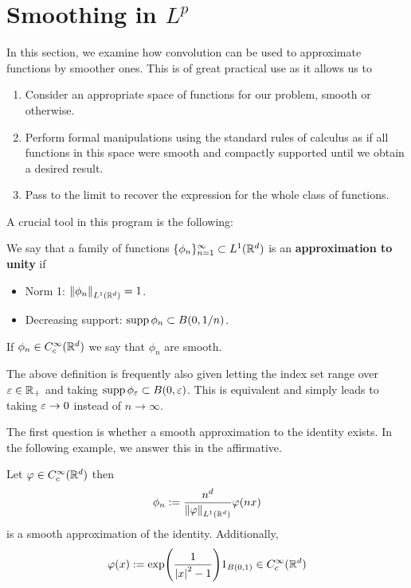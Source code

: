 \documentclass[
    a4paper,
    DIV=14,
    abstract=true,
    numbers=noenddot
]{scrartcl}
\begin{document}
\section{Smoothing in $L^p$}\label{smooth section}
In this section, we examine how convolution can be used to approximate functions by smoother ones. This is of great practical use as it allows us to
\begin{enumerate}
	\item Consider an appropriate space of functions for our problem, smooth or otherwise.
	\item Perform formal manipulations using the standard rules of calculus as if all functions in this space were smooth and compactly supported until we obtain a desired result.
	\item Pass to the limit to recover the expression for the whole class of functions.
\end{enumerate}
A crucial tool in this program is the following:
\begin{definition}\label{app def}
	We say that a family of functions $\{\phi_n\}_{n= 1}^\infty \subset L^1(\mathbb{R}^d)$ is an \textbf{approximation to unity} if
	\begin{itemize}
		\item Norm 1: $\left\lVert \phi_n \right\rVert_{L^1(\mathbb{R}^d)}=1$.
		\item Decreasing support: $\operatorname{supp}{\phi_n} \subset B(0, 1 /n)$.
	\end{itemize}
	If $\phi_n \in C_c^\infty(\mathbb{R}^d)$ we say that $\phi_n$ are smooth.
\end{definition}
\begin{observation}
	The above definition is frequently also given letting the index set range over $\varepsilon \in \mathbb{R}_+$ and taking $\operatorname{supp}{\phi_\varepsilon } \subset B(0,\varepsilon )$. This is equivalent and simply leads to taking $\varepsilon \to 0$ instead of $n \to \infty$. \end{observation}
The first question is whether a smooth approximation to the identity exists. In the following example, we answer this in the affirmative.
\begin{example}
	Let $\varphi \in C_c^\infty(\mathbb{R}^d)$ then
	\begin{align*}
		\phi_n:= \frac{n^d }{\left\lVert \varphi \right\rVert_{L^1(\mathbb{R}^d)}}\varphi(nx)
	\end{align*}
	is a smooth approximation of the identity. Additionally,
	\begin{align}\label{bump example}
		\varphi(x):=  \exp({\frac{1}{{\left| x \right|}^2-1}}) 1_{B(0,1)} \in C_c^\infty(\mathbb{R}^d)
	\end{align}
\end{example}
\end{document}
